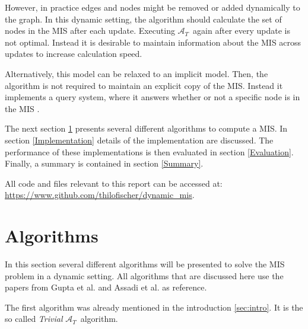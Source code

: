 \documentclass[letterpaper,11pt]{article}
\newcommand{\trivial}{$\mathcal{A}_T$\ }
\begin{document}
However, in practice edges and nodes might be removed or added dynamically to
the graph. In this dynamic setting, the algorithm should calculate the set of
nodes in the MIS after each update. Executing \trivial again after every
update is not optimal. Instead it is desirable to maintain information about the
MIS across updates to increase calculation speed.

Alternatively, this model can be relaxed to an implicit model. Then, the
algorithm is not required to maintain an explicit copy of the MIS. Instead it
implements a query system, where it answers whether or not a specific node is in
the MIS \cite{gupta2018simple}.

The next section \ref{Algorithms} presents several different algorithms to
compute a MIS. In section \ref{Implementation} details of the implementation are
discussed. The performance of these implementations is then evaluated in section
\ref{Evaluation}. Finally, a summary is contained in section \ref{Summary}.





%

All code and files relevant to this report can be accessed at:
\newline
\url{https://www.github.com/thilofischer/dynamic\_mis}.


\section{Algorithms}
\label{Algorithms}

In this section several different algorithms will be presented to solve the MIS
problem in a dynamic setting. All algorithms that are discussed here use the
papers from Gupta et al. \cite{gupta2018simple} and Assadi et al.
\cite{assadi2019fully} as reference.

The first algorithm was already mentioned in the introduction \ref{sec:intro}.
It is the so called \textit{Trivial} \trivial algorithm.
\end{document}

